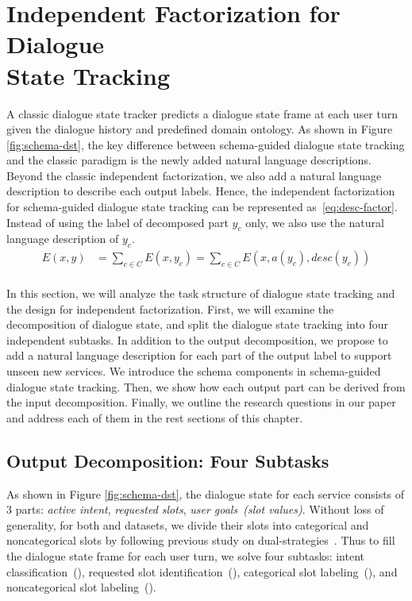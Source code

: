 
\section[Independent Factorization for Dialogue State Tracking]{Independent Factorization for Dialogue \\State Tracking}
\label{sec:sgd:ind-factorization}
A classic dialogue state tracker predicts a dialogue state frame at each
user turn given the dialogue history and predefined domain ontology. As
shown in Figure \ref{fig:schema-dst}, the key difference between
schema-guided dialogue state tracking and the classic paradigm is the
newly added natural language descriptions. Beyond the classic
independent factorization, we also add a natural language description
to describe each output labels. Hence, the independent factorization
for schema-guided dialogue state tracking can be represented
as~\autoref{eq:desc-factor}. Instead of using the label of decomposed
part $y_{c}$ only, we also use the natural language description of
$y_{c}$.
\begin{equation}
    \label{eq:desc-factor}
    \begin{split}
    E(x, y) & =\sum_{c \in C} E(x, y_{c}) = \sum_{c \in C}E(x, a(y_{c}), desc(y_{c}))  \\
    \end{split}
\end{equation}

In this section, we will
analyze the task structure of dialogue state tracking and the design
for independent factorization. First, we will examine the
decomposition of dialogue state, and split the dialogue state tracking
into four independent subtasks. In addition to the output
decomposition, we propose to add a natural language description for
each part of the output label to support unseen new services. We
introduce the schema components in schema-guided dialogue state
tracking. Then, we show how each output part can be derived from the
input decomposition. Finally, we outline the research questions in
our paper and address each of them in the rest sections of this
chapter.

\subsection{Output Decomposition: Four Subtasks}
\label{sec:sgd:decompose-y}
As shown in Figure \ref{fig:schema-dst}, the dialogue state for each
service consists of 3 parts: {\it active intent}, {\it requested
  slots}, {\it user goals~(slot values)}. Without loss of generality,
for both \sgdst and \multiwoz datasets, we divide their slots into
categorical and noncategorical slots by following previous study on
dual-strategies~\citep{zhang2019find}. Thus to fill the dialogue state
frame for each user turn, we solve four  subtasks:
intent classification~(\IC), requested slot identification~(\RSI),
categorical slot labeling~(\CSL), and noncategorical slot
labeling~(\NSL).

